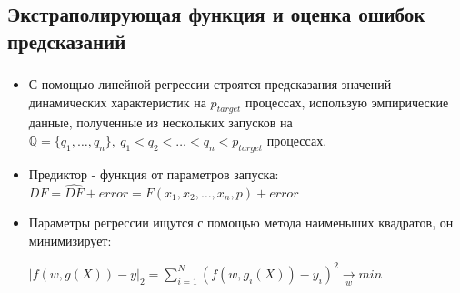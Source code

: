 \documentclass[unicode, t, 11pt]{beamer}%
\begin{document}
		\subsection{Экстраполирующая функция и оценка ошибок предсказаний}
			\begin{frame}
				\frametitle{\insertsection}
					\framesubtitle{\insertsubsection}
					\begin{itemize}[label = \(\bullet\)]
						\item С помощью линейной регрессии строятся предсказания значений динамических характеристик на \(p_{target}\) процессах, использую эмпирические данные, полученные из нескольких запусков на \(\mathbb{Q} = \{q_1,\ldots, q_n\},\ q_1 < q_2 < \ldots < q_n < p_{target}\) процессах.
						\item Предиктор - функция от параметров запуска: \(DF = \hat{DF} + error = F(x_1, x_2, \ldots, x_n, p) + error\)
						\item Параметры регрессии ищутся с помощью метода наименьших квадратов, он минимизирует:

						{\small\(|f(w, g(X)) - y|_2 = \sum_{i = 1}^{N}{(f(w, g_i(X)) - y_i)^2 \xrightarrow[w]{} min}\)}
					\end{itemize}
			\end{frame}
\end{document}
